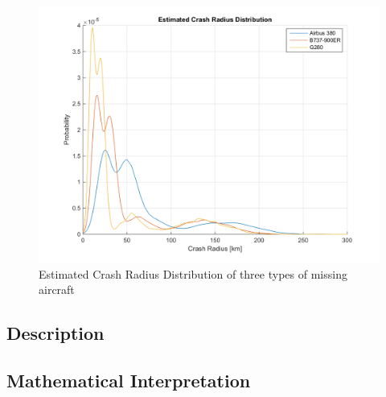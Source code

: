 \documentclass[12pt, letterpaper]{article}  %
\theoremstyle{definition}
\theoremstyle{remark}
\theoremstyle{plain}
\begin{document}
\begin{center}
	\begin{figure}[H]
		\includegraphics[width=0.9\linewidth]{simulation/CrashRadiusExplain.png}
		\caption{Estimated Crash Radius Distribution of three types of missing aircraft}
		\label{fig:CrashRadius}
	\end{figure}
\end{center}


\subsection{Description}\label{subsecmeth:desc}



\subsection{Mathematical Interpretation}\label{subsecDist:math}

\end{document}
